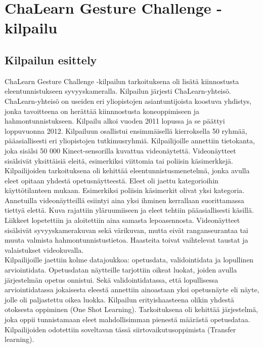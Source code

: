 \section{ChaLearn Gesture Challenge -kilpailu}
\label{ChaLearn Gesture Challenge -kilpailu}

\subsection{Kilpailun esittely}
ChaLearn Gesture Challenge -kilpailun tarkoituksena oli lisätä kiinnostusta eleentunnistukseen syvyyskameralla.
Kilpailun järjesti ChaLearn-yhteisö. ChaLearn-yhteisö on useiden eri yliopistojen asiantuntijoista koostuva yhdistys,
jonka tavoitteena on herättää kiinnnostusta koneoppimiseen ja hahmontunnistukseen. \citep{kilpailunnettisivut} Kilpailu alkoi vuoden 2011 lopussa ja se päättyi loppuvuonna 2012. Kilpailuun osallistui ensimmäisellä kierroksella 50 ryhmää,
pääasiallisesti eri yliopistojen tutkimusryhmiä. Kilpailijoille annettiin tietokanta, joka sisälsi 50 000 Kinect-sensorilla kuvattua videonäytettä. 
Videonäytteet sisälsivät yksittäisiä eleitä, esimerkiksi viittomia tai poliisin käsimerkkejä. Kilpailijoiden tarkoituksena oli kehittää eleentunnistusmenetelmä, 
jonka avulla eleet opitaan yhdestä opetusnäytteestä. Eleet oli jaettu kategorioihin käyttötilanteen mukaan. Esimerkiksi poliisin käsimerkit olivat yksi kategoria.
\citep{6239178} \\

Annetuilla videonäytteillä esiintyi aina yksi ihminen kerrallaan suorittamassa tiettyä elettä. Kuva rajattiin yläruumiiseen ja eleet tehtiin
pääasiallisesti käsillä. Liikkeet lopetettiin ja aloitettiin aina samasta lepoasennosta. Videonäytteet sisälsivät syvyyskamerakuvan sekä värikuvan, 
mutta eivät ranganseurantaa tai muuta valmista hahmontunnistustietoa. Haasteita toivat vaihtelevat taustat ja valaistukset videokuvalla.  \citep{6239178}\\

Kilpailijoille jaettiin kolme datajoukkoa: opetusdata, validointidata ja lopullinen arviointidata. 
Opetusdatan näytteille tarjottiin oikeat luokat, joiden avulla järjestelmän opetus onnistui.
Sekä validointidatassa, että lopullisessa arviointidatassa jokaisesta eleestä annettiin ainoastaan yksi opetusnäyte eli näyte,
jolle oli paljastettu oikea luokka. Kilpailun erityishaasteena olikin yhdestä otoksesta oppiminen (One Shot Learning). 
Tarkoituksena oli kehittää järjestelmä, joka oppii tunnistamaan eleet mahdollisimman pienestä määrästä opetusdataa. 
Kilpailijoiden odotettiin soveltavan tässä siirtovaikutusoppimista (Transfer learning). \citep{6239178} \\

